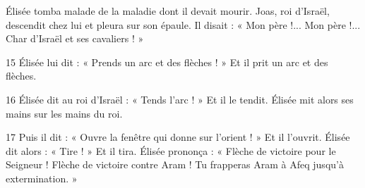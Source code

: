 Élisée tomba malade de la maladie dont il devait mourir. Joas, roi d’Israël, descendit chez lui et pleura sur son épaule. Il disait : « Mon père !... Mon père !... Char d’Israël et ses cavaliers ! »

15 Élisée lui dit : « Prends un arc et des flèches ! » Et il prit un arc et des flèches.

16 Élisée dit au roi d’Israël : « Tends l’arc ! » Et il le tendit. Élisée mit alors ses mains sur les mains du roi.

17 Puis il dit : « Ouvre la fenêtre qui donne sur l’orient ! » Et il l’ouvrit. Élisée dit alors : « Tire ! » Et il tira. Élisée prononça : « Flèche de victoire pour le Seigneur ! Flèche de victoire contre Aram ! Tu frapperas Aram à Afeq jusqu’à extermination. »
